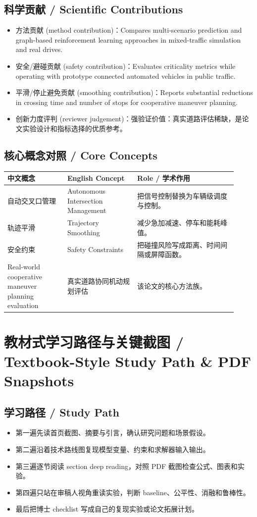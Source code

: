\documentclass[UTF8,a4paper,11pt,fontset=fandol]{ctexart}
\begin{document}
\subsection{科学贡献 / Scientific Contributions}
\begin{itemize}
\item 方法贡献 (method contribution)：Compares multi-scenario prediction and graph-based reinforcement learning approaches in mixed-traffic simulation and real drives.
\item 安全/避碰贡献 (safety contribution)：Evaluates criticality metrics while operating with prototype connected automated vehicles in public traffic.
\item 平滑/停止避免贡献 (smoothing contribution)：Reports substantial reductions in crossing time and number of stops for cooperative maneuver planning.
\item 创新力度评判 (reviewer judgement)：强验证价值：真实道路评估稀缺，是论文实验设计和指标选择的优质参考。
\end{itemize}


\subsection{核心概念对照 / Core Concepts}
\begin{longtable}{p{0.24\linewidth}p{0.28\linewidth}p{0.40\linewidth}}
\toprule
中文概念 & English Concept & Role / 学术作用\\
\midrule
自动交叉口管理 & Autonomous Intersection Management & 把信号控制替换为车辆级调度与控制。 \\
轨迹平滑 & Trajectory Smoothing & 减少急加减速、停车和能耗峰值。 \\
安全约束 & Safety Constraints & 把碰撞风险写成距离、时间间隔或屏障函数。 \\
Real-world cooperative maneuver planning evaluation & 真实道路协同机动规划评估 & 该论文的核心方法族。 \\
\bottomrule
\end{longtable}

\section{教材式学习路径与关键截图 / Textbook-Style Study Path \& PDF Snapshots}
\subsection{学习路径 / Study Path}
\begin{itemize}
\item 第一遍先读首页截图、摘要与引言，确认研究问题和场景假设。
\item 第二遍沿着技术路线图复现模型变量、约束和求解器输入输出。
\item 第三遍逐节阅读 section deep reading，对照 PDF 截图检查公式、图表和实验。
\item 第四遍只站在审稿人视角重读实验，判断 baseline、公平性、消融和鲁棒性。
\item 最后把博士 checklist 写成自己的复现实验或论文拓展计划。
\end{itemize}
\end{document}
